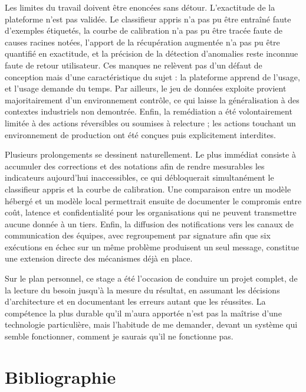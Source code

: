 \documentclass[12pt,a4paper,oneside]{report}
\begin{document}
Les limites du travail doivent être enoncées sans détour. L'exactitude de la
plateforme n'est pas validée. Le classifieur appris n'a pas pu être entraîné
faute d'exemples étiquetés, la courbe de calibration n'a pas pu être tracée faute
de causes racines notées, l'apport de la récupération augmentée n'a pas pu être
quantifié en exactitude, et la précision de la détection d'anomalies reste
inconnue faute de retour utilisateur. Ces manques ne relèvent pas d'un défaut de
conception mais d'une caractéristique du sujet : la plateforme apprend de l'usage,
et l'usage demande du temps. Par ailleurs, le jeu de données exploite provient
majoritairement d'un environnement contrôle, ce qui laisse la généralisation à des
contextes industriels non demontrée. Enfin, la remédiation a été volontairement
limitée à des actions réversibles ou soumises à relecture ; les actions touchant
un environnement de production ont été conçues puis explicitement interdites.

Plusieurs prolongements se dessinent naturellement. Le plus immédiat consiste à
accumuler des corrections et des notations afin de rendre mesurables les
indicateurs aujourd'hui inaccessibles, ce qui débloquerait simultanément le
classifieur appris et la courbe de calibration. Une comparaison entre un modèle
hébergé et un modèle local permettrait ensuite de documenter le compromis entre
coût, latence et confidentialité pour les organisations qui ne peuvent transmettre
aucune donnée à un tiers. Enfin, la diffusion des notifications vers les canaux de
communication des équipes, avec regroupement par signature afin que six exécutions
en échec sur un même problème produisent un seul message, constitue une extension
directe des mécanismes déjà en place.

Sur le plan personnel, ce stage a été l'occasion de conduire un projet complet, de
la lecture du besoin jusqu'à la mesure du résultat, en assumant les décisions
d'architecture et en documentant les erreurs autant que les réussites. La
compétence la plus durable qu'il m'aura apportée n'est pas la maîtrise d'une
technologie particulière, mais l'habitude de me demander, devant un système qui
semble fonctionner, comment je saurais qu'il ne fonctionne pas.

\clearpage

\chapter*{Bibliographie}
\end{document}
